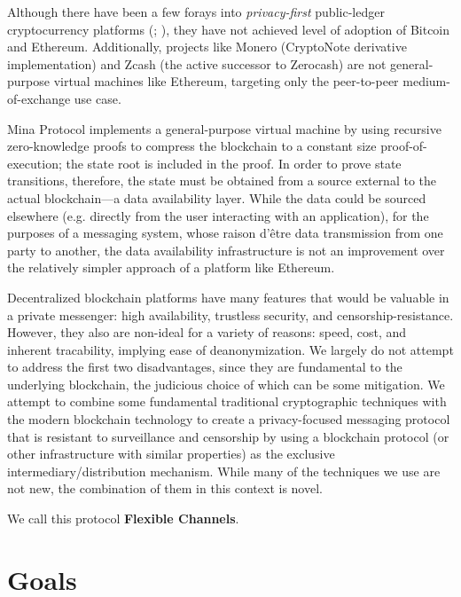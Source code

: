 Although there have been a few forays into \emph{privacy-first} public-ledger cryptocurrency platforms (\cite[CryptoNote:][]{saberhagen_cryptonote_2013}; \cite[Zerocash:][]{sasson_zerocash_2014}), they have not achieved level of adoption of Bitcoin and Ethereum. Additionally, projects like Monero (CryptoNote derivative implementation) and Zcash (the active successor to Zerocash) are not general-purpose virtual machines like Ethereum, targeting only the peer-to-peer medium-of-exchange use case.

Mina Protocol implements a general-purpose virtual machine by using recursive zero-knowledge proofs to compress the blockchain to a constant size proof-of-execution; the state root is included in the proof. \parencite{bonneau_mina_2020} In order to prove state transitions, therefore, the state must be obtained from a source external to the actual blockchain---a data availability layer. While the data could be sourced elsewhere (e.g. directly from the user interacting with an application), for the purposes of a messaging system, whose raison d'\^{e}tre data transmission from one party to another, the data availability infrastructure is not an improvement over the relatively simpler approach of a platform like Ethereum.

\bigskip

Decentralized blockchain platforms have many features that would be valuable in a private messenger: high availability, trustless security, and censorship-resistance. However, they also are non-ideal for a variety of reasons: speed, cost, and inherent tracability, implying ease of deanonymization. We largely do not attempt to address the first two disadvantages, since they are fundamental to the underlying blockchain, the judicious choice of which can be some mitigation. We attempt to combine some fundamental traditional cryptographic techniques with the modern blockchain technology to create a privacy-focused messaging protocol that is resistant to surveillance and censorship by using a blockchain protocol (or other infrastructure with similar properties) as the exclusive intermediary/distribution mechanism. While many of the techniques we use are not new, the combination of them in this context is novel.

We call this protocol \textbf{Flexible Channels}.

\section{Goals}\label{goals}

